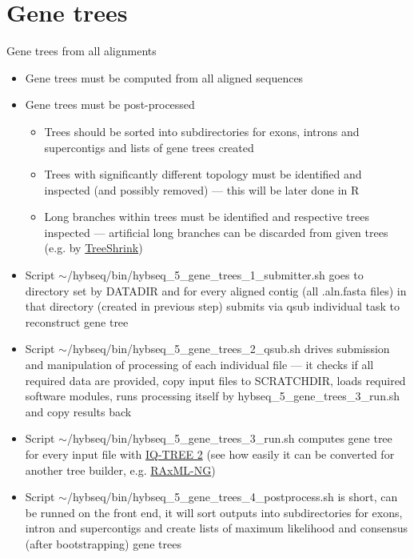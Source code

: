 \documentclass[compress,  xelatex, 11pt, xcolor=x11names, aspectratio=169,
	hyperref={
		bookmarks=true,
		unicode=true,
		colorlinks=true,
		pdftitle={HybSeq course},
		plainpages=false,
		pdfauthor={Vojtech Zeisek},
		pdfsubject={Practical processing of HybSeq target enrichment sequencing data on computing grids like MetaCentrum},
		pdfcreator={XeLaTeX},
		pdfkeywords={BASH, command line, GNU, HybSeq, Linux, MetaCentrum, sequencing shell, target enrichment},
		linkcolor=Turquoise4, %
		anchorcolor=DodgerBlue4, %
		citecolor=DodgerBlue4, %
		filecolor=DodgerBlue4, %
		menucolor=Tan4, %
		urlcolor=DarkOliveGreen4 %
		},
	url={hyphens, lowtilde} %
	]{beamer}
\renewcommand{\texttt}[1]{\colorbox{Cornsilk2}{{\ttfamily #1}}}
\begin{document}
\section{Gene trees}

\begin{frame}[allowframebreaks]{Gene trees from all alignments}
	\begin{itemize}
		\item Gene trees must be computed from all aligned sequences
		\item Gene trees must be post-processed
		\begin{itemize}
			\item Trees should be sorted into subdirectories for exons, introns and supercontigs and lists of gene trees created
			\item Trees with significantly different topology must be identified and inspected (and possibly removed) --- this will be later done in \texttt{R}
			\item Long branches within trees must be identified and respective trees inspected --- artificial long branches can be discarded from given trees (e.g. by \href{https://github.com/uym2/TreeShrink}{TreeShrink})
		\end{itemize}
		\item Script \texttt{$\sim$/hybseq/bin/hybseq\_5\_gene\_trees\_1\_submitter.sh} goes to directory set by \texttt{DATADIR} and for every aligned contig (all \texttt{*.aln.fasta} files) in that directory (created in previous step) submits via \texttt{qsub} individual task to reconstruct gene tree
		\item Script \texttt{$\sim$/hybseq/bin/hybseq\_5\_gene\_trees\_2\_qsub.sh} drives submission and manipulation of processing of each individual file --- it checks if all required data are provided, copy input files to \texttt{SCRATCHDIR}, loads required software modules, runs processing itself by \texttt{hybseq\_5\_gene\_trees\_3\_run.sh} and copy results back
		\item Script \texttt{$\sim$/hybseq/bin/hybseq\_5\_gene\_trees\_3\_run.sh} computes gene tree for every input file with \href{http://www.iqtree.org/}{IQ-TREE 2} (see how easily it can be converted for another tree builder, e.g. \href{https://github.com/amkozlov/raxml-ng}{RAxML-NG})
		\item Script \texttt{$\sim$/hybseq/bin/hybseq\_5\_gene\_trees\_4\_postprocess.sh} is short, can be runned on the front end, it will sort outputs into subdirectories for exons, intron and supercontigs and create lists of maximum likelihood and consensus (after bootstrapping) gene trees
	\end{itemize}
\end{frame}
\end{document}
